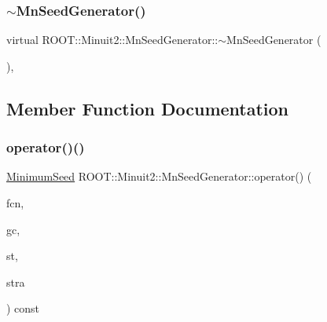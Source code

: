 \mbox{\label{classROOT_1_1Minuit2_1_1MnSeedGenerator_a3dee518720bebaac31b0bdd5b64c9856}} 
\subsubsection{\texorpdfstring{$\sim$MnSeedGenerator()}{~MnSeedGenerator()}\hspace{0.1cm}{\footnotesize\ttfamily [3/3]}}
{\footnotesize\ttfamily virtual R\+O\+O\+T\+::\+Minuit2\+::\+Mn\+Seed\+Generator\+::$\sim$\+Mn\+Seed\+Generator (\begin{DoxyParamCaption}{ }\end{DoxyParamCaption})\hspace{0.3cm}{\ttfamily [inline]}, {\ttfamily [virtual]}}



\subsection{Member Function Documentation}
\mbox{\label{classROOT_1_1Minuit2_1_1MnSeedGenerator_a654d0f1b67cd1a3a17de8334ba811ef0}} 
\subsubsection{\texorpdfstring{operator()()}{operator()()}\hspace{0.1cm}{\footnotesize\ttfamily [1/6]}}
{\footnotesize\ttfamily \mbox{\hyperlink{classROOT_1_1Minuit2_1_1MinimumSeed}{Minimum\+Seed}} R\+O\+O\+T\+::\+Minuit2\+::\+Mn\+Seed\+Generator\+::operator() (\begin{DoxyParamCaption}\item[{const \mbox{\hyperlink{classROOT_1_1Minuit2_1_1MnFcn}{Mn\+Fcn}} \&}]{fcn,  }\item[{const \mbox{\hyperlink{classROOT_1_1Minuit2_1_1GradientCalculator}{Gradient\+Calculator}} \&}]{gc,  }\item[{const \mbox{\hyperlink{classROOT_1_1Minuit2_1_1MnUserParameterState}{Mn\+User\+Parameter\+State}} \&}]{st,  }\item[{const \mbox{\hyperlink{classROOT_1_1Minuit2_1_1MnStrategy}{Mn\+Strategy}} \&}]{stra }\end{DoxyParamCaption}) const\hspace{0.3cm}{\ttfamily [virtual]}}



